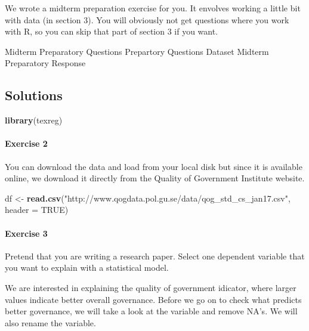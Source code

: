 \documentclass[]{article}
\newenvironment{Shaded}{\begin{snugshade}}{\end{snugshade}}
\newcommand{\KeywordTok}[1]{\textcolor[rgb]{0.13,0.29,0.53}{\textbf{#1}}}
\newcommand{\DataTypeTok}[1]{\textcolor[rgb]{0.13,0.29,0.53}{#1}}
\newcommand{\StringTok}[1]{\textcolor[rgb]{0.31,0.60,0.02}{#1}}
\newcommand{\CommentTok}[1]{\textcolor[rgb]{0.56,0.35,0.01}{\textit{#1}}}
\newcommand{\OtherTok}[1]{\textcolor[rgb]{0.56,0.35,0.01}{#1}}
\newcommand{\OperatorTok}[1]{\textcolor[rgb]{0.81,0.36,0.00}{\textbf{#1}}}
\newcommand{\NormalTok}[1]{#1}
\let\oldparagraph\paragraph
\renewcommand{\paragraph}[1]{\oldparagraph{#1}\mbox{}}
\theoremstyle{definition}
\theoremstyle{definition}
\theoremstyle{definition}
\theoremstyle{remark}
\begin{document}
We wrote a midterm preparation exercise for you. It envolves working a
little bit with data (in section 3). You will obviously not get
questions where you work with R, so you can skip that part of section 3
if you want.

Midterm Preparatory Questions Prepartory Questions Dataset Midterm
Preparatory Response

\subsection{Solutions}\label{solutions-6}

\begin{Shaded}
\begin{Highlighting}[]
\KeywordTok{library}\NormalTok{(texreg)}
\end{Highlighting}
\end{Shaded}

\paragraph{Exercise 2}\label{exercise-2-4}

You can download the data and load from your local disk but since it is
available online, we download it directly from the Quality of Government
Institute website.

\begin{Shaded}
\begin{Highlighting}[]
\NormalTok{df <-}\StringTok{ }\KeywordTok{read.csv}\NormalTok{(}\StringTok{"http://www.qogdata.pol.gu.se/data/qog_std_cs_jan17.csv"}\NormalTok{, }\DataTypeTok{header =} \OtherTok{TRUE}\NormalTok{)}
\end{Highlighting}
\end{Shaded}

\paragraph{Exercise 3}\label{exercise-3-6}

Pretend that you are writing a research paper. Select one dependent
variable that you want to explain with a statistical model.

We are interested in explaining the quality of government idicator,
where larger values indicate better overall governance. Before we go on
to check what predicts better governance, we will take a look at the
variable and remove NA's. We will also rename the variable.

\begin{Shaded}
\end{Shaded}
\end{document}

